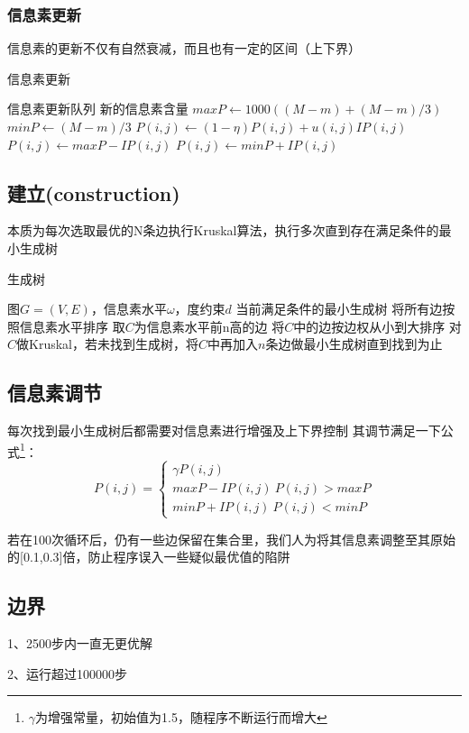 \subsubsection{信息素更新}
信息素的更新不仅有自然衰减，而且也有一定的区间（上下界）
\vspace{0.6cm}
\begin{breakablealgorithm}
    \caption{信息素更新}
    \begin{algorithmic}[1]
        \Require 信息素更新队列
        \Ensure 新的信息素含量
            \State $maxP \gets 1000((M-m)+(M-m)/3)$
            \State $minP \gets (M-m)/3$
                \State $P(i,j)\gets (1-\eta)P(i,j)+u(i,j)IP(i,j)$
                    \State $P(i,j)\gets maxP-IP(i,j)$
                \Else
                        \State $P(i,j)\gets minP+IP(i,j)$
                    \EndIf
                \EndIf
            \EndWhile
        \EndFunction
    \end{algorithmic}
\end{breakablealgorithm}

\subsection{建立(construction)}
本质为每次选取最优的N条边执行Kruskal算法，执行多次直到存在满足条件的最小生成树
\vspace{0.6cm}
\begin{breakablealgorithm}
    \caption{生成树}
    \begin{algorithmic}[1]
        \Require 图$G=(V,E)$，信息素水平$\omega$，度约束$d$
        \Ensure 当前满足条件的最小生成树
            \State 将所有边按照信息素水平排序
            \State 取$C$为信息素水平前n高的边
            \State 将$C$中的边按边权从小到大排序
            \State 对$C$做Kruskal，若未找到生成树，将$C$中再加入$n$条边做最小生成树直到找到为止
            \State {}
        \EndFunction
    \end{algorithmic}
\end{breakablealgorithm}

\subsection{信息素调节}

每次找到最小生成树后都需要对信息素进行增强及上下界控制
其调节满足一下公式\footnote[1]{$\gamma$为增强常量，初始值为1.5，随程序不断运行而增大}：
$$
P(i,j)=
\left\{\begin{matrix}
\gamma P(i,j)
\\ 
maxP-IP(i,j)\ P(i,j)>maxP
\\ 
minP+IP(i,j)\ P(i,j)<minP
\end{matrix}\right.
$$

若在100次循环后，仍有一些边保留在集合里，我们人为将其信息素调整至其原始的[0.1,0.3]倍，防止程序误入一些疑似最优值的陷阱

\subsection{边界}

1、2500步内一直无更优解
\par
2、运行超过100000步

